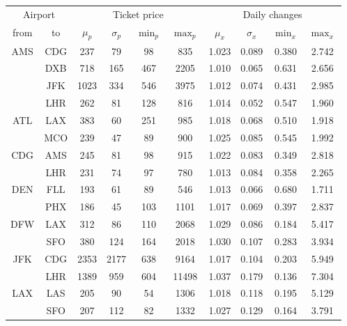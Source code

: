 \begin{table}
\centering
\footnotesize
\begin{tabular}{c c | c c c c | c c c c}
\toprule
\multicolumn{2}{c|}{Airport}  & \multicolumn{4}{c|}{Ticket price} & \multicolumn{4}{c}{Daily changes} \\[.4ex]
from & to    &  $\mu_{p}$ & $\sigma_{p}$  &  $\min_p$  & $\max_p$  & $\mu_x$ & $\sigma_x$  & $\min_x$  &  $\max_x$ \\ 
\midrule

AMS  &  CDG  &   237  &    79  &    98  &   835  &  1.023  &  0.089  &  0.380  &  2.742  \\
~    &  DXB  &   718  &   165  &   467  &  2205  &  1.010  &  0.065  &  0.631  &  2.656  \\
~    &  JFK  &  1023  &   334  &   546  &  3975  &  1.012  &  0.074  &  0.431  &  2.985  \\
~    &  LHR  &   262  &    81  &   128  &   816  &  1.014  &  0.052  &  0.547  &  1.960  \\[.5ex]
ATL  &  LAX  &   383  &    60  &   251  &   985  &  1.018  &  0.068  &  0.510  &  1.918  \\
~    &  MCO  &   239  &    47  &    89  &   900  &  1.025  &  0.085  &  0.545  &  1.992  \\[.5ex]
CDG  &  AMS  &   245  &    81  &    98  &   915  &  1.022  &  0.083  &  0.349  &  2.818  \\
~    &  LHR  &   231  &    74  &    97  &   780  &  1.013  &  0.084  &  0.358  &  2.265  \\[.5ex]
DEN  &  FLL  &   193  &    61  &    89  &   546  &  1.013  &  0.066  &  0.680  &  1.711  \\
~    &  PHX  &   186  &    45  &   103  &  1101  &  1.017  &  0.069  &  0.397  &  2.837  \\[.5ex]
DFW  &  LAX  &   312  &    86  &   110  &  2068  &  1.029  &  0.086  &  0.184  &  5.417  \\
~    &  SFO  &   380  &   124  &   164  &  2018  &  1.030  &  0.107  &  0.283  &  3.934  \\[.5ex]
JFK  &  CDG  &  2353  &  2177  &   638  &  9164  &  1.017  &  0.104  &  0.203  &  5.949  \\
~    &  LHR  &  1389  &   959  &   604  &  11498  &  1.037  &  0.179  &  0.136  &  7.304  \\[.5ex]
LAX  &  LAS  &   205  &    90  &    54  &  1306  &  1.018  &  0.118  &  0.195  &  5.129  \\
~    &  SFO  &   207  &   112  &    82  &  1332  &  1.027  &  0.129  &  0.164  &  3.791  \\[.5ex]

\end{tabular}
\end{table}

